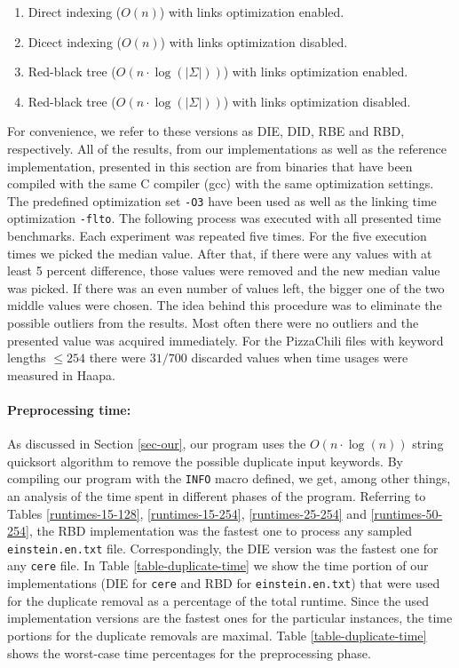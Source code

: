 \documentclass[english,twoside,censored,csm,algorithms-track-2020]{HYthesisML}
\theoremstyle{plain}
\theoremstyle{definition}
\begin{document}


\begin{enumerate}
\item Direct indexing ($O(n)$) with links optimization enabled.
\item Dicect indexing ($O(n)$) with links optimization disabled.
\item Red-black tree ($O(n\cdot\log(|\Sigma|))$) with links optimization enabled.
\item Red-black tree ($O(n\cdot\log(|\Sigma|))$) with links optimization disabled.
\end{enumerate}

For convenience, we refer to these versions as DIE, DID, RBE and RBD, respectively. All of the results,
from our implementations as well as the reference implementation,
presented in this section are from binaries that have been compiled with the same C
compiler (gcc) with the same optimization settings. The predefined optimization set \texttt{-O3} have
been used as well as the linking time optimization \texttt{-flto}. The following process was executed
with all presented time benchmarks. Each experiment was repeated five times. For
the five execution times we picked the median value. After that, if there were any values with 
at least 5 percent difference, those values were removed and the new median value was picked.
If there was an even number of values left, the bigger one of the two middle values were chosen.
The idea behind this procedure was to eliminate the possible outliers from the results. Most often
there were no outliers and the presented value was acquired immediately. For the PizzaChili files
with keyword lengths $\leq 254$ there were $31/700$ discarded values when time usages were
measured in Haapa.

\paragraph{Preprocessing time:}
As discussed in Section \ref{sec-our}, our program uses the $O(n\cdot\log(n))$ string quicksort
algorithm to remove the possible duplicate input keywords. By compiling our program with the
\texttt{INFO} macro defined, we get, among other things, an analysis of the time spent in different phases
of the program. Referring to Tables \ref{runtimes-15-128}, \ref{runtimes-15-254},
\ref{runtimes-25-254} and \ref{runtimes-50-254}, the RBD implementation was the fastest one
to process any sampled \texttt{einstein.en.txt}
file. Correspondingly, the DIE version was the fastest one for any \texttt{cere} file. In Table
\ref{table-duplicate-time}
we show the time portion of our implementations (DIE for \texttt{cere} and RBD for
\texttt{einstein.en.txt}) that were
used for the duplicate removal as a percentage of the total runtime. Since the used  implementation
versions are the fastest ones for the particular instances, the time portions for the duplicate
removals are maximal. Table \ref{table-duplicate-time} shows the worst-case time percentages
for the preprocessing phase.
\end{document}
